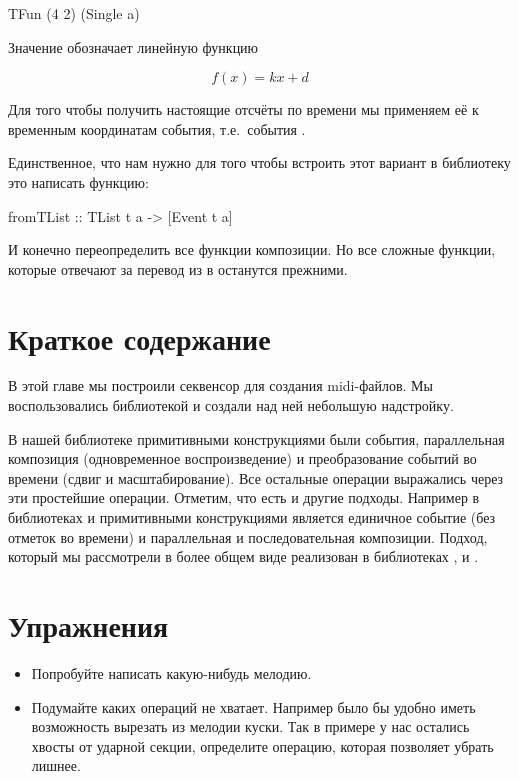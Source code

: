\begin{code}
TFun (4 2) (Single a)
\end{code}

Значение  обозначает линейную функцию

\[ f(x) = k x + d \]

Для того чтобы получить настоящие отсчёты по времени мы
применяем её к временным координатам 
события, т.е.~события .

Единственное, что нам нужно для того
чтобы встроить этот вариант в библиотеку это написать
функцию:

\begin{code}
fromTList :: TList t a -> [Event t a]
\end{code}

И конечно переопределить все функции композиции.
Но все сложные функции, которые отвечают за перевод 
из  в  останутся прежними.


\section{Краткое содержание}

В этой главе мы построили секвенсор для создания 
midi-файлов. Мы воспользовались библиотекой  
и создали над ней небольшую надстройку. 

В нашей библиотеке примитивными конструкциями были
события, параллельная композиция (одновременное воспроизведение)
и преобразование событий во времени (сдвиг и масштабирование).
Все остальные операции выражались через эти простейшие операции.
Отметим, что есть и другие подходы. Например в библиотеках
 и  примитивными конструкциями
является единичное событие (без отметок во времени) и
параллельная и последовательная композиции. Подход, который
мы рассмотрели в более общем виде реализован в библиотеках
,  и
.

\section{Упражнения}

\begin{itemize}
\item  Попробуйте написать какую-нибудь мелодию.
\item  Подумайте каких операций не хватает. 
    Например было бы удобно иметь возможность вырезать 
    из мелодии куски. Так в примере у нас остались 
    хвосты от ударной секции, определите операцию,
    которая позволяет убрать лишнее.
\end{itemize}


